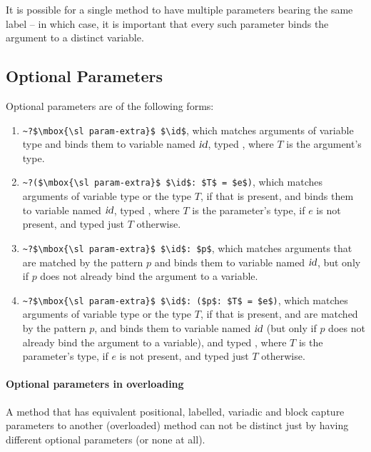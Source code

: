 It is possible for a single method to have multiple parameters bearing the same label -- in which case, it is important that every such parameter binds the argument to a distinct variable. 





\subsection{Optional Parameters}
\label{sec:optional-parameters}

Optional parameters are of the following forms:
\begin{enumerate}
  \item \lstinline!~?$\mbox{\sl param-extra}$ $\id$!, which matches arguments of variable type and binds them to variable named $\mbox{\sl id}$, typed , where $T$ is the argument's type. 
  \item \lstinline!~?($\mbox{\sl param-extra}$ $\id$: $T$ = $e$)!, which matches arguments of variable type or the type $T$, if that is present, and binds them to variable named $\mbox{\sl id}$, typed , where $T$ is the parameter's type, if $e$ is not present, and typed just $T$ otherwise.
  \item \lstinline!~?$\mbox{\sl param-extra}$ $\id$: $p$!, which matches arguments that are matched by the pattern $p$ and binds them to variable named $\mbox{\sl id}$, but only if $p$ does not already bind the argument to a variable. 
  \item \lstinline!~?$\mbox{\sl param-extra}$ $\id$: ($p$: $T$ = $e$)!, which matches arguments of variable type or the type $T$, if that is present, and are matched by the pattern $p$, and binds them to variable named $\mbox{\sl id}$ (but only if $p$ does not already bind the argument to a variable), and typed , where $T$ is the parameter's type, if $e$ is not present, and typed just $T$ otherwise.
\end{enumerate}

\paragraph{Optional parameters in overloading}
A method that has equivalent positional, labelled, variadic and block capture parameters to another (overloaded) method can not be distinct just by having different optional parameters (or none at all). 





